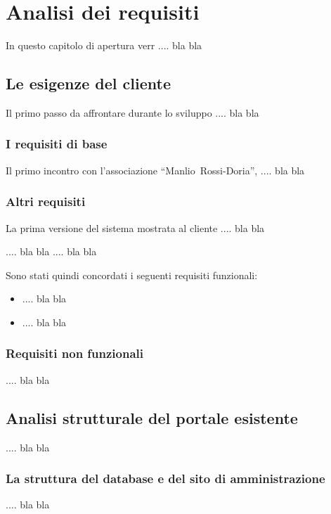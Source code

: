 \chapter{Analisi dei requisiti}\label{capitolo:analisi}
In questo capitolo di apertura verr .... bla bla

\section{Le esigenze del cliente}
Il primo passo da affrontare durante lo sviluppo .... bla bla

\subsection{I requisiti di base}
Il primo incontro con l'associazione ``Manlio~Rossi-Doria'',  .... bla bla



\subsection{Altri requisiti}
La prima versione del sistema mostrata al cliente  .... bla bla

 .... bla bla
 .... bla bla


Sono stati quindi concordati i seguenti requisiti funzionali:
\begin{itemize}
	\item	 .... bla bla
	\item	 .... bla bla
\end{itemize}



\subsection{Requisiti non funzionali}
 .... bla bla

\section{Analisi strutturale del portale esistente}
 .... bla bla

\subsection{La struttura del database e del sito di amministrazione}
 .... bla bla
